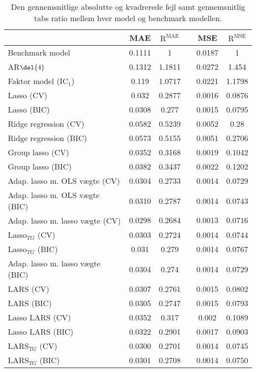 \begin{table}[ht]
\center
\begin{tabular}{lccccc}
\toprule
 & MAE & \(\text{R}^{\text{MAE}}\) && MSE & \(\text{R}^{\text{MSE}}\) \\ \midrule
 Benchmark model & 0.1111 & 1 && 0.0187 & 1 \\
AR\(\del{4}\) & 0.1312 & 1.1811 && 0.0272 & 1.454 \\  
Faktor model (IC\(_1\)) & 0.119 & 1.0717 && 0.0221 & 1.1798 \\
Lasso (CV) & 0.032 & 0.2877 && 0.0016 & 0.0876 \\
Lasso (BIC) & 0.0308 & 0.277 && 0.0015 & 0.0795 \\
Ridge regression (CV) & 0.0582 & 0.5239 && 0.0052 & 0.28 \\
Ridge regression (BIC) & 0.0573 & 0.5155 && 0.0051 & 0.2706 \\
Group lasso (CV) & 0.0352 & 0.3168 && 0.0019 & 0.1042  \\
Group lasso (BIC) & 0.0382 & 0.3437 && 0.0022 & 0.1202 \\
Adap. lasso m. OLS vægte (CV) & 0.0304 & 0.2733 && 0.0014 & 0.0729 \\
Adap. lasso m. OLS vægte (BIC) & 0.0310 & 0.2787 && 0.0014 & 0.0743 \\
Adap. lasso m. lasso vægte (CV) & $\mathbf{0.0298}$ & $\mathbf{0.2684}$ && $\mathbf{0.0013}$ & $\mathbf{0.0716}$ \\
Lasso$_{TG}$ (CV)& 0.0303 & 0.2724 && 0.0014 & 0.0744 \\ 
Lasso$_{TG}$ (BIC) & 0.031 & 0.279 && 0.0014 & 0.0767 \\
Adap. lasso m. lasso vægte (BIC) & 0.0304 & 0.274  && 0.0014 & 0.0729 \\
LARS (CV) &  0.0307 & 0.2761 && 0.0015 & 0.0802 \\
LARS (BIC) & 0.0305 & 0.2747 && 0.0015 & 0.0793 \\
Lasso LARS (CV) &  0.0352 & 0.317 && 0.002 & 0.1089 \\
Lasso LARS (BIC) & 0.0322 & 0.2901 && 0.0017 & 0.0903 \\
LARS$_{TG}$ (CV) & 0.0300 & 0.2701 && 0.0014 & 0.0745 \\
LARS$_{TG}$ (BIC) & 0.0301 & 0.2708 && 0.0014 & 0.0750 \\ \bottomrule
\end{tabular}
\caption{Den gennemsnitlige absolutte og kvadrerede fejl samt gennemsnitlig tabs ratio mellem hver model og benchmark modellen.} \label{tab:mae_mse_vurdering}
\end{table}
